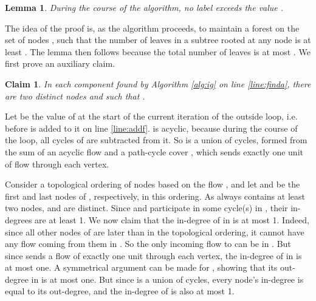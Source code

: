 \documentclass[11pt]{article}
\newcommand{\qed}{\hspace*{\fill}}
\newtheorem{lemma}[theorem]{Lemma}
\newtheorem{claim}[theorem]{Claim}
\newenvironment{proof}[1][Proof. ]{\noindent {\bf #1 }}{\qed}
\begin{document}
\begin{lemma} \label{lem:label}
During the course of the algorithm, no label  exceeds the value .
\end{lemma}

The idea of the proof is, as the algorithm proceeds, to maintain a forest on the set of nodes , such that the number of leaves in a subtree rooted at any node  is at least . The lemma then follows because the total number of leaves is at most . 
We first prove an auxiliary claim.

\begin{claim} \label{claim:xy}
In each component  found by  Algorithm \ref{alg:ig} on line \ref{line:finda}, there are two distinct nodes  and  such that .
\end{claim}
\begin{proof}
Let  be the value of  at the start of the current iteration of the outside loop, 
i.e. before  is added to it on line \ref{line:addf}.  is acyclic, because during 
the course of the loop, all cycles of  are subtracted from it. So  is a union of cycles, 
formed from the sum of an acyclic flow  and a path-cycle cover , which sends exactly 
one unit of flow through each vertex. 

Consider a topological ordering of nodes based on the flow , and let  and  be 
the first and last nodes of , respectively, in this ordering. As  always contains at least 
two nodes,  and  are distinct. Since  and  participate in some cycle(s) in , their 
in-degrees are at least 1. We now claim that the in-degree of  in  is at most 1.  Indeed, 
since all other nodes of  are later than  in the topological ordering, it cannot have any 
flow coming from them in . So the only incoming flow to  can be in .  But since 
 sends a flow of exactly one unit through each vertex, the in-degree of  in  is at most 
one.  A symmetrical argument can be made for , showing that its out-degree in  is at most 
one.  But since  is a union of cycles, every node's in-degree is equal to its out-degree, and 
the in-degree of  is also at most 1.
\end{proof}
\end{document}
